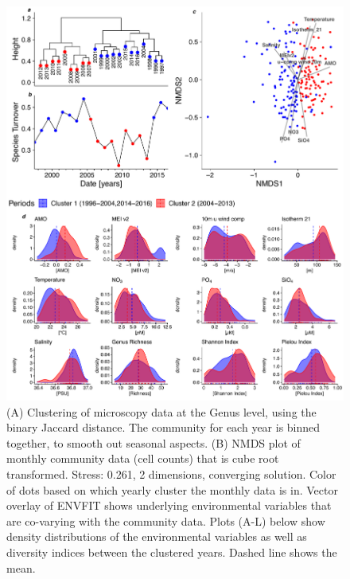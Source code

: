 \documentclass[draft]{agujournal2019}
\begin{document}
\begin{figure}
\noindent\includegraphics[width=\textwidth]{fig/ClusteringCompPlot_NEW.pdf}
\caption{(A) Clustering of microscopy data at the Genus level, using the binary Jaccard distance. The community for each year is binned together, to smooth out seasonal aspects. (B) NMDS plot of monthly community data (cell counts) that is cube root transformed. Stress: 0.261, 2 dimensions, converging solution. Color of dots based on which yearly cluster the monthly data is in. Vector overlay of ENVFIT shows underlying environmental variables that are co-varying with the community data. \newline
Plots (A-L) below show density distributions of the environmental variables as well as diversity indices between the clustered years. Dashed line shows the mean.}
\end{figure}
\end{document}
